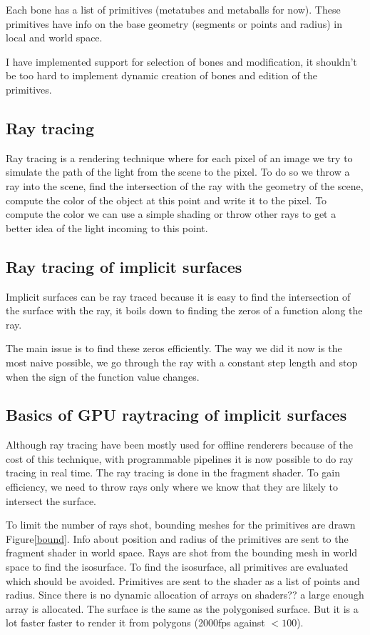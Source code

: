 \documentclass[11pt]{article}
\numberwithin{figure}{section}
\begin{document}
Each bone has a list of primitives (metatubes and metaballs for now). These primitives have info on the base geometry (segments or points and radius) in local and world space.

I have implemented support for selection of bones and modification, it shouldn't be too hard to implement dynamic creation of bones and edition of the primitives.


\subsection{Ray tracing}

Ray tracing is a rendering technique where for each pixel of an image we try to simulate the path of the light from the scene to the pixel.
To do so we throw a ray into the scene, find the intersection of the ray with the geometry of the scene, compute the color of the object at this point and write it to the pixel. To compute the color we can use a simple shading or throw other rays to get a better idea of the light incoming to this point. 

\subsection{Ray tracing of implicit surfaces}

Implicit surfaces can be ray traced because it is easy to find the intersection of the surface with the ray, it boils down to finding the zeros of a function along the ray.

The main issue is to find these zeros efficiently.
The way we did it now is the most naive possible, we go through the ray with a constant step length and stop when the sign of the function value changes.

\subsection{Basics of GPU raytracing of implicit surfaces}

Although ray tracing have been mostly used for offline renderers because of the cost of this technique, with programmable pipelines it is now possible to do ray tracing in real time.
The ray tracing is done in the fragment shader.
To gain efficiency, we need to throw rays only where we know that they are likely to intersect the surface.

To limit the number of rays shot, bounding meshes for the primitives are drawn Figure\ref{bound}.
Info about position and radius of the primitives are sent to the fragment shader in world space.
Rays are shot from the bounding mesh in world space to find the isosurface.
To find the isosurface, all primitives are evaluated which should be avoided. Primitives are sent to the shader as a list of points and radius. Since there is no dynamic allocation of arrays on shaders??
a large enough array is allocated.
The surface is the same as the polygonised surface. But it is a lot faster faster to render it from polygons (2000fps against $<100$).
\end{document}
